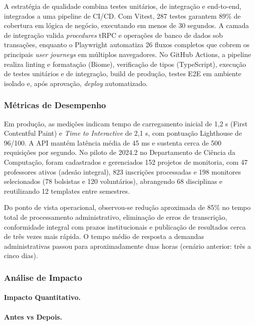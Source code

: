\documentclass[portuguese]{sbc2025}%
\begin{document}
A estratégia de qualidade combina testes unitários, de integração e end-to-end, integrados a uma pipeline de CI/CD. Com Vitest, 287 testes garantem 89\% de cobertura em lógica de negócio, executando em menos de 30 segundos. A camada de integração valida \textit{procedures} tRPC e operações de banco de dados sob transações, enquanto o Playwright automatiza 26 fluxos completos que cobrem os principais \textit{user journeys} em múltiplos navegadores. No GitHub Actions, a pipeline realiza linting e formatação (Biome), verificação de tipos (TypeScript), execução de testes unitários e de integração, build de produção, testes E2E em ambiente isolado e, após aprovação, \textit{deploy} automatizado.

\subsubsection{Métricas de Desempenho}

Em produção, as medições indicam tempo de carregamento inicial de 1,2 s (First Contentful Paint) e \textit{Time to Interactive} de 2,1 s, com pontuação Lighthouse de 96/100. A API mantém latência média de 45 ms e sustenta cerca de 500 requisições por segundo. No piloto de 2024.2 no Departamento de Ciência da Computação, foram cadastrados e gerenciados 152 projetos de monitoria, com 47 professores ativos (adesão integral), 823 inscrições processadas e 198 monitores selecionados (78 bolsistas e 120 voluntários), abrangendo 68 disciplinas e reutilizando 12 templates entre semestres.

Do ponto de vista operacional, observou-se redução aproximada de 85\% no tempo total de processamento administrativo, eliminação de erros de transcrição, conformidade integral com prazos institucionais e publicação de resultados cerca de três vezes mais rápida. O tempo médio de resposta a demandas administrativas passou para aproximadamente duas horas (cenário anterior: três a cinco dias).

\subsubsection{Análise de Impacto}

\paragraph{Impacto Quantitativo.}

\paragraph{Antes vs Depois.}
\end{document}
